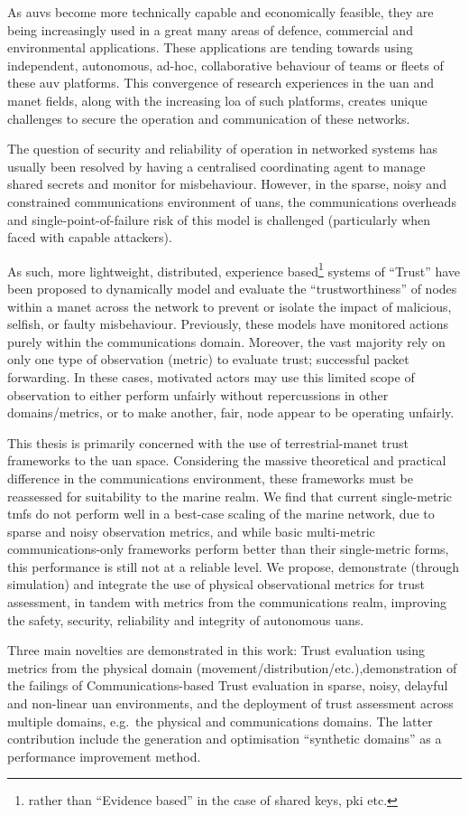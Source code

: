 As \glspl{auv} become more technically capable and economically feasible, they are being increasingly used in a great many areas of defence, commercial and environmental applications. 
These applications are tending towards using independent, autonomous, ad-hoc, collaborative behaviour of teams or fleets of these \gls{auv} platforms.
This convergence of research experiences in the \gls{uan} and \gls{manet} fields, along with the increasing \gls{loa} of such platforms, creates unique challenges to secure the operation and communication of these networks.

The question of security and reliability of operation in networked systems has usually been resolved by having a centralised coordinating agent to manage shared secrets and monitor for misbehaviour.
However, in the sparse, noisy and constrained communications environment of \glspl{uan}, the communications overheads and single-point-of-failure risk of this model is challenged (particularly when faced with capable attackers).

As such, more lightweight, distributed, experience based\footnote{rather than ``Evidence based'' in the case of shared keys, \gls{pki} etc.} systems of ``Trust'' have been proposed to dynamically model and evaluate the ``trustworthiness'' of nodes within a \gls{manet} across the network to prevent or isolate the impact of malicious, selfish, or faulty misbehaviour. 
Previously, these models have monitored actions purely within the communications domain. 
Moreover, the vast majority rely on only one type of observation (metric) to evaluate trust; successful packet forwarding.
In these cases, motivated actors may use this limited scope of observation to either perform unfairly without repercussions in other domains/metrics, or to make another, fair, node appear to be operating unfairly.

This thesis is primarily concerned with the use of terrestrial-\gls{manet} trust frameworks to the \gls{uan} space. 
Considering the massive theoretical and practical difference in the communications environment, these frameworks must be reassessed for suitability to the marine realm. 
We find that current single-metric \glspl{tmf} do not perform well in a best-case scaling of the marine network, due to sparse and noisy observation metrics, and while basic multi-metric communications-only frameworks perform better than their single-metric forms, this performance is still not at a reliable level. 
We propose, demonstrate (through simulation) and integrate the use of physical observational metrics for trust assessment, in tandem with metrics from the communications realm, improving the safety, security, reliability and integrity of autonomous \glspl{uan}.

Three main novelties are demonstrated in this work:
Trust evaluation using metrics from the physical domain (movement/distribution/etc.),demonstration of the failings of Communications-based Trust evaluation in sparse, noisy, delayful and non-linear \gls{uan} environments, and the deployment of trust assessment across multiple domains, e.g.\ the physical and communications domains.
The latter contribution include the generation and optimisation ``synthetic domains'' as a performance improvement method.
